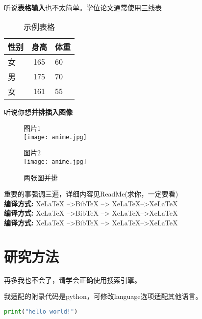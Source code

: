 \documentclass[AutoFakeBold]{fduthesis}
\begin{document}
\par 听说\textbf{表格输入}也不太简单。学位论文通常使用三线表
\begin{table}[htbp] 
	\centering	
	\begin{tabular}{lcl} 
		\toprule 
		性别 & 身高 & 体重 \\ 
		\midrule 
		 女 & 165 & 60 \\ 
	     男 & 175 & 70 \\ 
		 女 & 161 & 55 \\ 
		\bottomrule 
	\end{tabular} 
\caption{\label{tab:test}示例表格} 
\end{table}
\par 听说你想\textbf{并排插入图像}
\begin{figure}[H]
	\begin{minipage}[t]{0.5\textwidth}
	\centering
	\tiny 图片1 \\
	\vspace{0.5cm}
	\texttt{[image: anime.jpg]}
\end{minipage}
\begin{minipage}[t]{0.5\textwidth}
	\centering 
	\tiny 图片2 \\
	\vspace{0.5cm}
	\texttt{[image: anime.jpg]}  
\end{minipage}	
\protect\caption{两张图并排 \label {fig:two-pics}}	
\end{figure}

\par 重要的事强调三遍，详细内容见ReadMe(求你，一定要看) \\
{\bfseries 编译方式:} XeLaTeX -->BibTeX --> XeLaTeX-->XeLaTeX \\
{\bfseries 编译方式:} XeLaTeX -->BibTeX --> XeLaTeX-->XeLaTeX \\
{\bfseries 编译方式:} XeLaTeX -->BibTeX --> XeLaTeX-->XeLaTeX
\chapter{研究方法}
\par 再多我也不会了，请学会正确使用搜索引擎。
\par 我适配的附录代码是python，可修改language选项适配其他语言。

\begin{lstlisting}[language = python]
print("hello world!")

\end{lstlisting}
\end{document}
